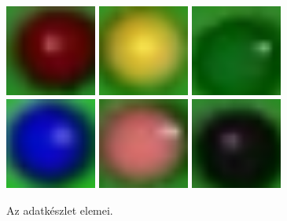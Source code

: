 \begin{figure}[!ht]
    \centering
    \includegraphics[width=30mm, keepaspectratio]{figures/dataset_1.png}\hspace{5mm}
    \includegraphics[width=30mm, keepaspectratio]{figures/dataset_2.png}\hspace{5mm}
	\includegraphics[width=30mm, keepaspectratio]{figures/dataset_3.png}\\\vspace{5mm}
    \includegraphics[width=30mm, keepaspectratio]{figures/dataset_4.png}\hspace{5mm}
    \includegraphics[width=30mm, keepaspectratio]{figures/dataset_5.png}\hspace{5mm}
	\includegraphics[width=30mm, keepaspectratio]{figures/dataset_6.png}\\\vspace{5mm}
    \caption{Az adatkészlet elemei.}
    \label{fig:adatkeszlet}
\end{figure}


